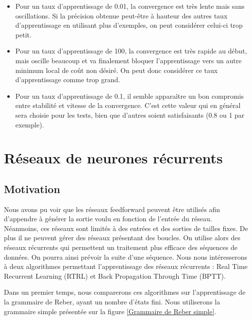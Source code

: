 \documentclass{report}
\begin{document}
\begin{itemize}

\item Pour un taux d'apprentissage de 0.01, la convergence est très lente mais sans oscillations. Si la précision obtenue peut-être à hauteur des autres taux d'apprentissage en utilisant plus d'exemples, on peut considérer celui-ci trop petit.
\item Pour un taux d'apprentissage de 100, la convergence est très rapide au début, mais oscille beaucoup et va finalement bloquer l'apprentissage vers un autre minimum local de coût non désiré. On peut donc considérer ce taux d'apprentissage comme trop grand.
\item Pour un taux d'apprentissage de 0.1, il semble apparaître un bon compromis entre stabilité et vitesse de la convergence. C'est cette valeur qui en général sera choisie pour les tests, bien que d'autres soient satisfaisants (0.8 ou 1 par exemple).

\end{itemize}

\chapter{Réseaux de neurones récurrents}
\section{Motivation}
Nous avons pu voir que les réseaux feedforward peuvent être utilisés afin d'appendre à générer la sortie voulu en fonction de l'entrée du réseau. 
Néanmoins, ces réseaux sont limités à des entrées et des sorties de tailles fixes. De plus il ne peuvent gérer des réseaux présentant des boucles. On utilise alors des réseaux récurrents qui permettent un traitement plus efficace des séquences de données. On pourra ainsi prévoir la suite d'une séquence.
\bigbreak
Nous nous intéresserons à deux algorithmes permettant l'apprentissage des réseaux récurrents : Real Time Recurrent Learning (RTRL) et Back Propagation Through Time (BPTT).

Dans un premier temps, nous comparerons ces algorithmes sur l'apprentissage de la grammaire de Reber, ayant un nombre d'états fini. Nous utiliserons la grammaire simple présentée sur la figure \ref{Grammaire de Reber simple}.
\end{document}
